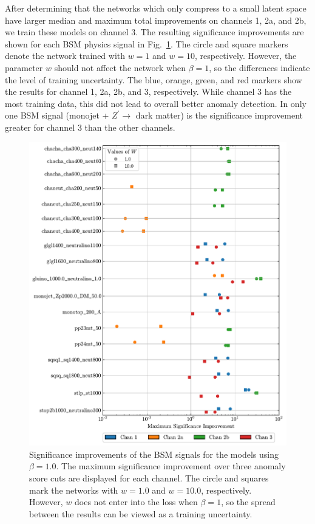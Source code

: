\documentclass[submission, Phys]{SciPost}
\begin{document}
After determining that the networks which only compress to a small latent space have larger median and maximum total improvements on channels 1, 2a, and 2b, we train these models on channel 3.
The resulting significance improvements are shown for each BSM physics signal in Fig.~\ref{fig:SI}.
The circle and square markers denote the network trained with $w=1$ and $w=10$, respectively.
However, the parameter $w$ should not affect the network when $\beta=1$, so the differences indicate the level of training uncertainty.
The blue, orange, green, and red markers show the results for channel 1, 2a, 2b, and 3, respectively.
While channel 3 has the most training data, this did not lead to overall better anomaly detection.
In only one BSM signal (monojet + $Z^{\prime}\rightarrow$ dark matter) is the significance improvement greater for channel 3 than the other channels.

\begin{figure}[p]
    \begin{center}
    \includegraphics[width=\linewidth]{figures/PhysicsSignalSignificanceImprovementFixedTarget}
    \caption{Significance improvements of the BSM signals for the models using $\beta=1.0$.
    The maximum significance improvement over three anomaly score cuts are displayed for each channel.
    The circle and squares mark the networks with $w=1.0$ and $w=10.0$, respectively.
    However, $w$ does not enter into the loss when $\beta=1$, so the spread between the results can be viewed as a training uncertainty.
    }
    \label{fig:SI}
\end{center}
\end{figure}
\end{document}
